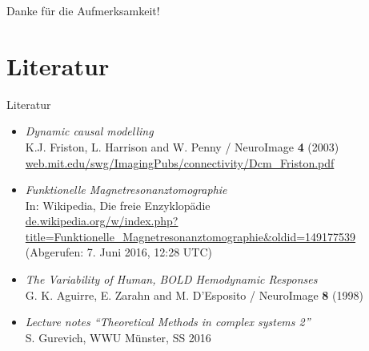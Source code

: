 \documentclass{beamer}
\begin{document}
\begin{frame}
\centering
\huge Danke für die Aufmerksamkeit!
\end{frame}


\section{Literatur}
	\begin{frame}{Literatur}
		\begin{itemize}
			\item \textit{Dynamic causal modelling} \\ {\small K.J. Friston, L. Harrison and W. Penny / NeuroImage \textbf{4} (2003)} \\ {\footnotesize \url{web.mit.edu/swg/ImagingPubs/connectivity/Dcm_Friston.pdf}}
			\item \textit{Funktionelle Magnetresonanztomographie}\\  {\small In: Wikipedia, Die freie Enzyklopädie}\\{\footnotesize \url{de.wikipedia.org/w/index.php?title=Funktionelle_Magnetresonanztomographie&oldid=149177539}}  {\tiny(Abgerufen: 7. Juni 2016, 12:28 UTC)}	
			\item \textit{The Variability of Human, BOLD Hemodynamic Responses} \\ {\small G. K. Aguirre, E. Zarahn  and M. D’Esposito / NeuroImage \textbf{8} (1998)}	
			\item \textit{Lecture notes “Theoretical Methods in complex systems 2”} \\ {\small S. Gurevich, WWU Münster, SS 2016}
		\end{itemize}
	\end{frame}
\end{document}
